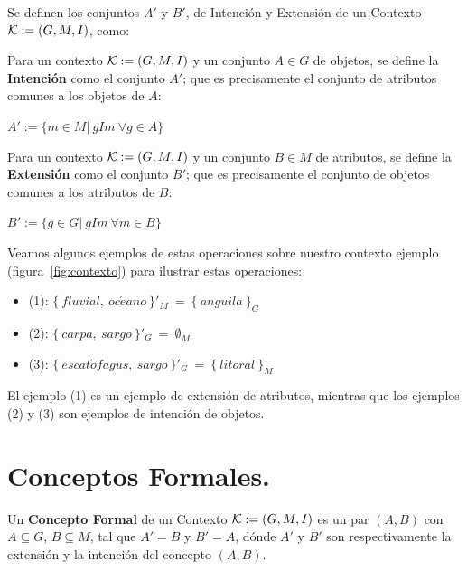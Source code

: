 Se definen los conjuntos $A'$ y $B'$, de Intención y Extensión de un Contexto ${\cal K} := (G,M,I)$, como:

\begin{defi}
Para un contexto ${\cal K} := (G,M,I)$ y un conjunto $A\in{G}$ de objetos, se define la {\bf Intención} como el conjunto $A'$; que es precisamente el conjunto de atributos comunes a los objetos de $A$:
\begin{center}
$A' := \{m\in{M}|\ gIm\ \forall{g\in{A}}\}$
\end{center}
\end{defi}

\begin{defi}
Para un contexto ${\cal K} := (G,M,I)$ y un conjunto $B\in{M}$ de atributos, se define la {\bf Extensión} como el conjunto $B'$; que es precisamente el conjunto de objetos comunes a los atributos de $B$: 
\begin{center}
$B' := \{g\in{G}|\ gIm\ \forall{m\in{B}}\}$
\end{center}
\end{defi}

Veamos algunos ejemplos de estas operaciones sobre nuestro contexto ejemplo (figura~\ref{fig:contexto}) para ilustrar estas operaciones:
\begin{itemize}
	\item (1): $\{\ fluvial,\ oc\acute{e}ano\ \}'_M\ =\ \{\ anguila\ \}_G$
	\item (2): $\{\ carpa,\ sargo\ \}'_G\ =\ \emptyset_M$
	\item (3): $\{\ escat\acute{o}fagus,\ sargo\ \}'_G\ =\ \{\ litoral\ \}_M$
\end{itemize}

El ejemplo (1) es un ejemplo de extensión de atributos, mientras que los ejemplos (2) y (3) son ejemplos de intención de objetos.







\section{Conceptos Formales.}

\begin{defi}
Un {\bf Concepto Formal} de un Contexto ${\cal K}:=(G,M,I)$ es un par $(A,B)$ con $A \subseteq G$, $B \subseteq M$, tal que $A' = B$ y $B' = A$, dónde $A'$ y $B'$ son respectivamente la extensión y la intención del concepto $(A,B)$.
\end{defi}


